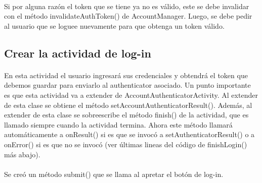 \documentclass[10pt]{extarticle}
\begin{document}
\paragraph{}
Si por alguna razón el token que se tiene ya no es válido, este se debe invalidar con el método invalidateAuthToken() de AccountManager. Luego, se debe pedir al usuario que se loguee nuevamente para que obtenga un token válido.

\subsection{Crear la actividad de log-in}

\paragraph{}
En esta actividad el usuario ingresará sus credenciales y obtendrá el token que debemos guardar para enviarlo al authenticator asociado. Un punto importante es que esta actividad va a extender de AccountAuthenticatorActivity. Al extender de esta clase se obtiene el método setAccountAuthenticatorResult(). Además, al extender de esta clase se sobreescribe el método finish() de la actividad, que es llamado siempre cuando la actividad termina. Ahora este método llamará automáticamente a onResult() si es que se invocó a setAuthenticatorResult() o a onError() si es que no se invocó (ver últimas lineas del código de finishLogin() más abajo).

\paragraph{}
Se creó un método submit() que se llama al apretar el botón de log-in.
\end{document}
